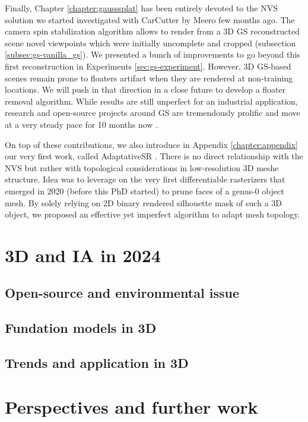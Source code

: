 Finally, Chapter \ref{chapter:gausssplat} has been entirely devoted to the \ac{NVS} solution we started investigated with CarCutter by Meero few months ago. The camera spin stabilization algorithm allows to render from a 3D \ac{GS} reconstructed scene novel viewpoints which were initially uncomplete and cropped (subsection \ref{subsec:gs-vanilla_gs}). We presented a bunch of improvements to go beyond this first reconstruction in Experiments \ref{sec:gs-experiment}. However, 3D \ac{GS}-based scenes remain prone to floaters artifact when they are rendered at non-training locations. We will push in that direction in a close future to develop a floater removal algorithm. While results are still unperfect for an industrial application, research and open-source projects around \ac{GS} \citep{kerbl20233d} are tremendously prolific and move at a very steady pace for 10 months now \citep{luiten2023dynamic,yang2024gaussianobject,wewer24latentsplat}. 

On top of these contributions, we also introduce in Appendix \ref{chapter:appendix} our very first work, called AdaptativeSR \citep{landreau2022adaptativesr}. There is no direct relationship with the \ac{NVS} but rather with topological considerations in low-resolution 3D meshe structure. Idea was to leverage on the very first differentiable rasterizers that emerged in 2020 \cite{liu2019soft} (before this PhD started) to prune faces of a genus-0 object mesh. By solely relying on 2D binary rendered silhouette mask of such a 3D object, we proposed an effective yet imperfect algorithm to adapt mesh topology. 

\section{3D and IA in 2024}
\subsection{Open-source and environmental issue}
\subsection{Fundation models in 3D}
\subsection{Trends and application in 3D}
\section{Perspectives and further work}

